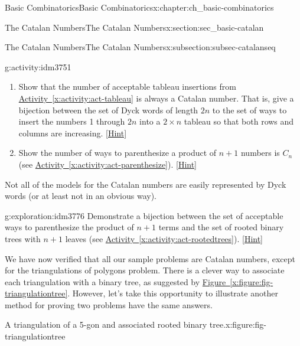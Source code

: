 \documentclass[oneside,10pt,]{book}
\numberwithin{equation}{chapter}
\begin{document}
\begin{chapterptx}{Basic Combinatorics}{}{Basic Combinatorics}{}{}{x:chapter:ch_basic-combinatorics}
\begin{sectionptx}{The Catalan Numbers}{}{The Catalan Numbers}{}{}{x:section:sec_basic-catalan}
\begin{subsectionptx}{The Catalan Numbers}{}{The Catalan Numbers}{}{}{x:subsection:subsec-catalanseq}
\begin{activity}{}{g:activity:idm3751}%
\begin{enumerate}[font=\bfseries,label=(\alph*),ref=\alph*]
\item{}Show that the number of acceptable tableau insertions from \hyperref[x:activity:act-tableau]{Activity~\ref{x:activity:act-tableau}} is always a Catalan number.  That is, give a bijection between the set of Dyck words of length \(2n\) to the set of ways to insert the numbers 1 through \(2n\) into a \(2\times n\) tableau so that both rows and columns are increasing.%
\space\hspace*{0pt}\hfill{\tiny\hyperlink{g:hint:idm3759-back}{[Hint]}}\item{}Show the number of ways to parenthesize a product of \(n+1\) numbers is \(C_n\) (see \hyperref[x:activity:act-parenthesize]{Activity~\ref{x:activity:act-parenthesize}}).%
\space\hspace*{0pt}\hfill{\tiny\hyperlink{g:hint:idm3767-back}{[Hint]}}\end{enumerate}
\end{activity}
Not all of the models for the Catalan numbers are easily represented by Dyck words (or at least not in an obvious way).%
\begin{exploration}{}{g:exploration:idm3776}%
Demonstrate a bijection between the set of acceptable ways to parenthesize the product of \(n+1\) terms and the set of rooted binary trees with \(n+1\) leaves (see \hyperref[x:activity:act-rootedtrees]{Activity~\ref{x:activity:act-rootedtrees}}).%
\space\hspace*{0pt}\hfill{\tiny\hyperlink{g:hint:idm3782-back}{[Hint]}}\end{exploration}
We have now verified that all our sample problems are Catalan numbers, except for the triangulations of polygons problem.  There is a clever way to associate each triangulation with a binary tree, as suggested by \hyperref[x:figure:fig-triangulationtree]{Figure~\ref{x:figure:fig-triangulationtree}}.  However, let's take this opportunity to illustrate another method for proving two problems have the same answers.%
\begin{figureptx}{A triangulation of a 5-gon and associated rooted binary tree.}{x:figure:fig-triangulationtree}%
\centering
\begin{sidebyside}{2}{0.125}{0.125}{0.25}%
\begin{sbspanel}{0.25}%


\end{sbspanel}
\end{sidebyside}
\end{figureptx}
\end{subsectionptx}
\end{sectionptx}
\end{chapterptx}
\end{document}
